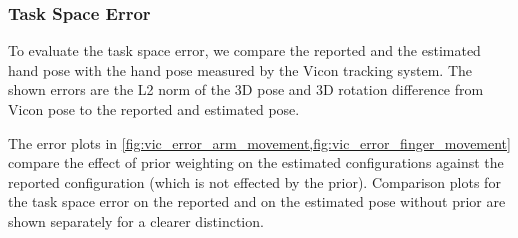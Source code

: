 \subsubsection{Task Space Error}

To evaluate the task space error, we compare the reported and the estimated hand pose with the hand pose measured by the Vicon tracking system. The shown errors are the L2 norm of the 3D pose and 3D rotation difference from Vicon pose to the reported and estimated pose.

The error plots in \cref{fig:vic_error_arm_movement,fig:vic_error_finger_movement} compare the effect of prior weighting on the estimated configurations against the reported configuration (which is not effected by the prior). Comparison plots for the task space error on the reported and on the estimated pose without prior are shown separately for a clearer distinction.

